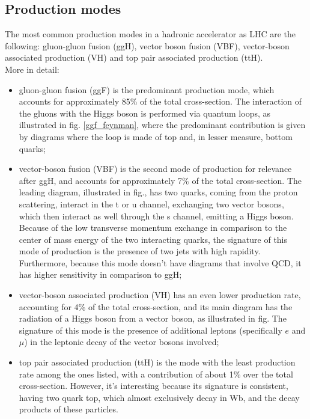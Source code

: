 \subsection{Production modes}
The most common production modes in a hadronic accelerator as LHC  are the following: gluon-gluon fusion (ggH), vector boson fusion (VBF), vector-boson associated production (VH) and top pair associated production (ttH).\\
More in detail:
\begin{itemize}
    \item gluon-gluon fusion (ggF) is the predominant production mode, which accounts for approximately 85\% of the total cross-section. The interaction of the gluons with the Higgs boson is performed via quantum loops, as illustrated in fig. \ref{ggf_feynman}, where the predominant contribution is given by diagrams where the loop is made of top and, in lesser measure, bottom quarks;
    \item vector-boson fusion (VBF) is the second mode of production for relevance after ggH, and accounts for approximately 7\% of the total cross-section. The leading diagram, illustrated in fig.,  has two quarks, coming from the proton scattering, interact in the t or u channel, exchanging two vector bosons, which then interact as well through the s channel, emitting a Higgs boson. Because of the low transverse momentum exchange in comparison to the center of mass energy of the two interacting quarks, the signature of this mode of production is the presence of two jets with high rapidity. Furthermore, because this mode doesn't have diagrams that involve QCD, it has higher sensitivity in comparison to ggH;
    \item vector-boson associated production (VH) has an even lower production rate, accounting for 4\% of the total cross-section, and its main diagram has the radiation of a Higgs boson from a vector boson, as illustrated in fig. The signature of this mode is the presence of additional leptons (specifically $e$ and $\mu$) in the leptonic decay of the vector bosons involved;
    \item top pair associated production (ttH) is the mode with the least production rate among the ones listed, with a contribution of about 1\% over the total cross-section. However, it's interesting because its signature is consistent, having two quark top, which almost exclusively decay in Wb, and the decay products of these particles.
\end{itemize}


